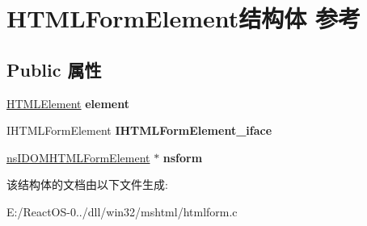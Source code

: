 \hypertarget{struct_h_t_m_l_form_element}{}\section{H\+T\+M\+L\+Form\+Element结构体 参考}
\label{struct_h_t_m_l_form_element}
\subsection*{Public 属性}
\begin{DoxyCompactItemize}
\item 
\mbox{\label{struct_h_t_m_l_form_element_a368a28480da79174460b775922c5f76a}} 
\hyperlink{struct_h_t_m_l_element}{H\+T\+M\+L\+Element} {\bfseries element}
\item 
\mbox{\label{struct_h_t_m_l_form_element_ad7081d2857dd223da7b951d5e2a93c64}} 
I\+H\+T\+M\+L\+Form\+Element {\bfseries I\+H\+T\+M\+L\+Form\+Element\+\_\+iface}
\item 
\mbox{\label{struct_h_t_m_l_form_element_aad0f5f6c3f1c2320936c47f050034307}} 
\hyperlink{interfacens_i_d_o_m_h_t_m_l_form_element}{ns\+I\+D\+O\+M\+H\+T\+M\+L\+Form\+Element} $\ast$ {\bfseries nsform}
\end{DoxyCompactItemize}


该结构体的文档由以下文件生成\+:\begin{DoxyCompactItemize}
\item 
E\+:/\+React\+O\+S-\/0../dll/win32/mshtml/htmlform.\+c\end{DoxyCompactItemize}

